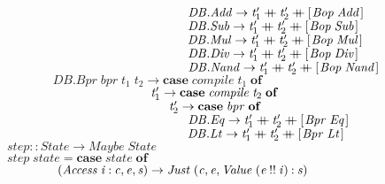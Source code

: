 \documentclass[10pt]{article}
\newcommand{\Conid}[1]{\mathit{#1}}
\newcommand{\Varid}[1]{\mathit{#1}}
\newcommand{\plus}{\mathbin{+\!\!\!+}}
\begin{document}
\begin{hscode}
${\phantom{\Varid{compile}\;\mbox{}}\hskip8.00em\relax\hskip1.50em\relax\hskip1.50em\relax\Conid{\Conid{DB}.Add}\to \Varid{t}_{1}'\plus \Varid{t}_{2}'\plus [\mskip1.5mu \Conid{Bop}\;\Conid{Add}\mskip1.5mu]}$\\
${\phantom{\Varid{compile}\;\mbox{}}\hskip8.00em\relax\hskip1.50em\relax\hskip1.50em\relax\Conid{\Conid{DB}.Sub}\to \Varid{t}_{1}'\plus \Varid{t}_{2}'\plus [\mskip1.5mu \Conid{Bop}\;\Conid{Sub}\mskip1.5mu]}$\\
${\phantom{\Varid{compile}\;\mbox{}}\hskip8.00em\relax\hskip1.50em\relax\hskip1.50em\relax\Conid{\Conid{DB}.Mul}\to \Varid{t}_{1}'\plus \Varid{t}_{2}'\plus [\mskip1.5mu \Conid{Bop}\;\Conid{Mul}\mskip1.5mu]}$\\
${\phantom{\Varid{compile}\;\mbox{}}\hskip8.00em\relax\hskip1.50em\relax\hskip1.50em\relax\Conid{\Conid{DB}.Div}\to \Varid{t}_{1}'\plus \Varid{t}_{2}'\plus [\mskip1.5mu \Conid{Bop}\;\Conid{Div}\mskip1.5mu]}$\\
${\phantom{\Varid{compile}\;\mbox{}}\hskip8.00em\relax\hskip1.50em\relax\hskip1.50em\relax\Conid{\Conid{DB}.Nand}\to \Varid{t}_{1}'\plus \Varid{t}_{2}'\plus [\mskip1.5mu \Conid{Bop}\;\Conid{Nand}\mskip1.5mu]}$\\
${}$\\
${\phantom{\Varid{compile}\;\mbox{}}\Conid{\Conid{DB}.Bpr}\;\Varid{bpr}\;\Varid{t}_{1}\;\Varid{t}_{2}\to \mathbf{case}\;\Varid{compile}\;\Varid{t}_{1}\;\mathbf{of}}$\\
${\phantom{\Varid{compile}\;\mbox{}}\hskip8.00em\relax\Varid{t}_{1}'\to \mathbf{case}\;\Varid{compile}\;\Varid{t}_{2}\;\mathbf{of}}$\\
${\phantom{\Varid{compile}\;\mbox{}}\hskip8.00em\relax\hskip1.50em\relax\Varid{t}_{2}'\to \mathbf{case}\;\Varid{bpr}\;\mathbf{of}}$\\
${\phantom{\Varid{compile}\;\mbox{}}\hskip8.00em\relax\hskip1.50em\relax\hskip1.50em\relax\Conid{\Conid{DB}.Eq}\to \Varid{t}_{1}'\plus \Varid{t}_{2}'\plus [\mskip1.5mu \Conid{Bpr}\;\Conid{Eq}\mskip1.5mu]}$\\
${\phantom{\Varid{compile}\;\mbox{}}\hskip8.00em\relax\hskip1.50em\relax\hskip1.50em\relax\Conid{\Conid{DB}.Lt}\to \Varid{t}_{1}'\plus \Varid{t}_{2}'\plus [\mskip1.5mu \Conid{Bpr}\;\Conid{Lt}\mskip1.5mu]}$\\
${\Varid{step}\mathbin{::}\Conid{State}\to \Conid{Maybe}\;\Conid{State}}$\\
${\Varid{step}\;\Varid{state}\mathrel{=}\mathbf{case}\;\Varid{state}\;\mathbf{of}}$\\
${\hskip4.00em\relax(\Conid{Access}\;\Varid{i}\mathbin{:}\Varid{c},\Varid{e},\Varid{s})\to \Conid{Just}\;(\Varid{c},\Varid{e},\Conid{Value}\;(\Varid{e}\mathbin{!!}\Varid{i})\mathbin{:}\Varid{s})}$\\

\end{hscode}
\end{document}
